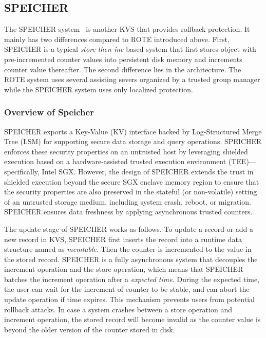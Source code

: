 \subsection{SPEICHER}

The SPEICHER system~\cite{bailleu2019speicher} is another KVS that provides rollback protection.
It mainly has two differences compared to ROTE introduced above. First, 
SPEICHER is a typical \textit{store-then-inc} based system that first stores 
object with pre-incremented counter values into persistent disk memory and increments
counter value thereafter. The second difference lies in the architecture. The ROTE system
uses several assisting severs organized by a trusted group manager while the SPEICHER system 
uses only localized protection.


\subsubsection{Overview of Speicher}

SPEICHER exports a Key-Value (KV) interface backed by Log-Structured Merge Tree (LSM) for supporting secure data storage and query operations. SPEICHER enforces these security properties on an untrusted host by leveraging shielded execution based on a hardware-assisted trusted execution environment (TEE)—specifically, Intel SGX. However, the design of SPEICHER extends the trust in shielded execution beyond the secure SGX enclave memory region to ensure that the security properties are also preserved in the stateful (or non-volatile) setting of an untrusted storage medium, including system crash, reboot, or migration. SPEICHER ensures data freshness by applying asynchronous trusted counters. 

The update stage of SPEICHER works as follows. To update a record or add a new 
record in KVS, SPEICHER first inserts the record into a runtime data structure
named as \textit{memtable}. Then the counter is incremented to the value in 
the stored record. SPEICHER is a fully asynchronous system that decouples the 
increment operation and the store operation, which means that SPEICHER batches
the increment operation after a \textit{expected time}. During the expected 
time, the user can wait for the increment of counter to be stable, and can 
abort the update operation if time expires. This mechanism prevents users 
from potential rollback attacks. In case a system crashes between a store
operation and increment operation, the stored record will become invalid as 
the counter value is beyond the older version of the counter stored in disk.


